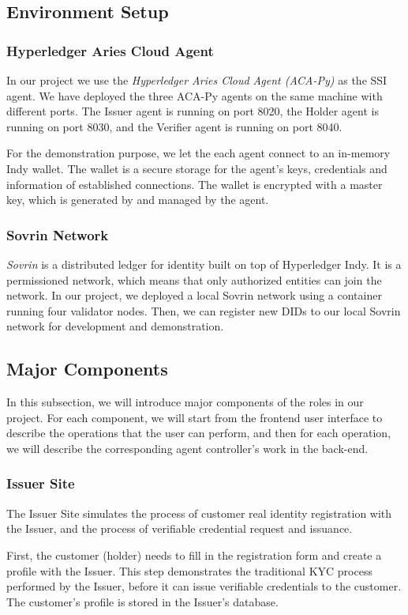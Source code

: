 \documentclass[
]{report}
\begin{document}
\subsection{Environment Setup}
\subsubsection{Hyperledger Aries Cloud Agent}
In our project we use the \emph{Hyperledger Aries Cloud Agent (ACA-Py)}
as the SSI agent. We have deployed the three ACA-Py agents on the same
machine with different ports. The Issuer agent is running on port 8020,
the Holder agent is running on port 8030, and the Verifier agent is
running on port 8040.

For the demonstration purpose, we let the each agent connect to an in-memory
Indy wallet. The wallet is a secure storage for the agent's keys,
credentials and information of established connections. The wallet is
encrypted with a master key, which is generated by and managed by the
agent.

\subsubsection{Sovrin Network}
\emph{Sovrin} is a distributed ledger for identity built on top of
Hyperledger Indy. It is a permissioned network, which means that only
authorized entities can join the network. In our project, we deployed a
local Sovrin network using a container running four validator nodes.
Then, we can register new DIDs to our local Sovrin network for development
and demonstration.

\subsection{Major Components}
In this subsection, we will introduce major components of the roles
in our project. For each component, we will start from the frontend user
interface to describe the operations that the user can perform, and then
for each operation, we will describe the corresponding agent controller's
work in the back-end.
\subsubsection{Issuer Site}
The Issuer Site simulates the process of customer real identity registration
with the Issuer, and the process of verifiable credential request and 
issuance. 

First, the customer (holder) needs to fill in the registration form and create a
profile with the Issuer. This step demonstrates the traditional KYC process
performed by the Issuer, before it can issue verifiable credentials to the
customer. The customer's profile is stored in the Issuer's database.
\end{document}
